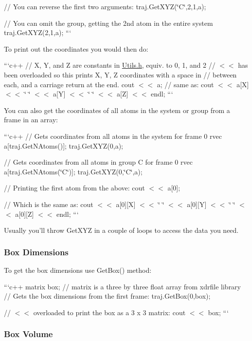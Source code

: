 // You can reverse the first two arguments\-: traj.\-Get\-X\-Y\-Z(\char`\"{}\-C\char`\"{},2,1,a);

// You can omit the group, getting the 2nd atom in the entire system traj.\-Get\-X\-Y\-Z(2,1,a); ```

To print out the coordinates you would then do\-:

```c++ // X, Y, and Z are constants in \hyperlink{Utils_8h_source}{Utils.\-h}, equiv. to 0, 1, and 2 // $<$$<$ has been overloaded so this prints X, Y, Z coordinates with a space in // between each, and a carriage return at the end. cout $<$$<$ a; // same as\-: cout $<$$<$ a\mbox{[}X\mbox{]} $<$$<$ \char`\"{} \char`\"{} $<$$<$ a\mbox{[}Y\mbox{]} $<$$<$ \char`\"{} \char`\"{} $<$$<$ a\mbox{[}Z\mbox{]} $<$$<$ endl; ```

You can also get the coordinates of all atoms in the system or group from a frame in an array\-:

```c++ // Gets coordinates from all atoms in the system for frame 0 rvec a\mbox{[}traj.\-Get\-N\-Atoms()\mbox{]}; traj.\-Get\-X\-Y\-Z(0,a);

// Gets coordinates from all atoms in group C for frame 0 rvec a\mbox{[}traj.\-Get\-N\-Atoms(\char`\"{}\-C\char`\"{})\mbox{]}; traj.\-Get\-X\-Y\-Z(0,\char`\"{}\-C\char`\"{},a);

// Printing the first atom from the above\-: cout $<$$<$ a\mbox{[}0\mbox{]};

// Which is the same as\-: cout $<$$<$ a\mbox{[}0\mbox{]}\mbox{[}X\mbox{]} $<$$<$ \char`\"{} \char`\"{} $<$$<$ a\mbox{[}0\mbox{]}\mbox{[}Y\mbox{]} $<$$<$ \char`\"{} \char`\"{} $<$$<$ a\mbox{[}0\mbox{]}\mbox{[}Z\mbox{]} $<$$<$ endl; ```

Usually you'll throw Get\-X\-Y\-Z in a couple of loops to access the data you need.

\subsubsection*{Box Dimensions}

To get the box dimensions use Get\-Box() method\-:

```c++ matrix box; // matrix is a three by three float array from xdrfile library // Gets the box dimensions from the first frame\-: traj.\-Get\-Box(0,box);

// $<$$<$ overloaded to print the box as a 3 x 3 matrix\-: cout $<$$<$ box; ```

\subsubsection*{Box Volume}

